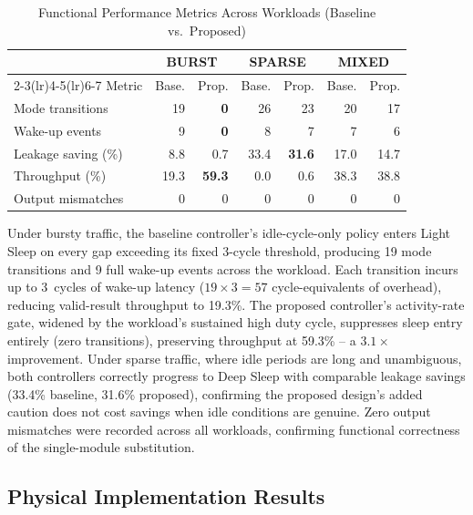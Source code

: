 \begin{table}[t]
\centering
\small
\caption{Functional Performance Metrics Across Workloads (Baseline vs.\ Proposed)}
\label{tab:functional}
\setlength{\tabcolsep}{5pt}
\begin{tabular}{@{}l rr rr rr@{}}
\toprule
 & \multicolumn{2}{c}{\textbf{BURST}} & \multicolumn{2}{c}{\textbf{SPARSE}} & \multicolumn{2}{c}{\textbf{MIXED}} \\
\cmidrule(lr){2-3}\cmidrule(lr){4-5}\cmidrule(lr){6-7}
Metric & Base. & Prop. & Base. & Prop. & Base. & Prop. \\
\midrule
Mode transitions       & 19   & \textbf{0}    & 26   & 23   & 20   & 17   \\
Wake-up events         & 9    & \textbf{0}    & 8    & 7    & 7    & 6    \\
Leakage saving (\%)    & 8.8  & 0.7  & 33.4 & \textbf{31.6} & 17.0 & 14.7 \\
Throughput (\%)        & 19.3 & \textbf{59.3} & 0.0  & 0.6  & 38.3 & 38.8 \\
Output mismatches      & 0    & 0    & 0    & 0    & 0    & 0    \\
\bottomrule
\end{tabular}
\end{table}

Under bursty traffic, the baseline controller's idle-cycle-only policy enters Light Sleep on every gap exceeding its fixed 3-cycle threshold, producing 19 mode transitions and 9 full wake-up events across the workload. Each transition incurs up to 3~cycles of wake-up latency ($19 \times 3 = 57$ cycle-equivalents of overhead), reducing valid-result throughput to 19.3\%. The proposed controller's activity-rate gate, widened by the workload's sustained high duty cycle, suppresses sleep entry entirely (zero transitions), preserving throughput at 59.3\% -- a $3.1\times$ improvement. Under sparse traffic, where idle periods are long and unambiguous, both controllers correctly progress to Deep Sleep with comparable leakage savings (33.4\% baseline, 31.6\% proposed), confirming the proposed design's added caution does not cost savings when idle conditions are genuine. Zero output mismatches were recorded across all workloads, confirming functional correctness of the single-module substitution.

\subsection{Physical Implementation Results}

